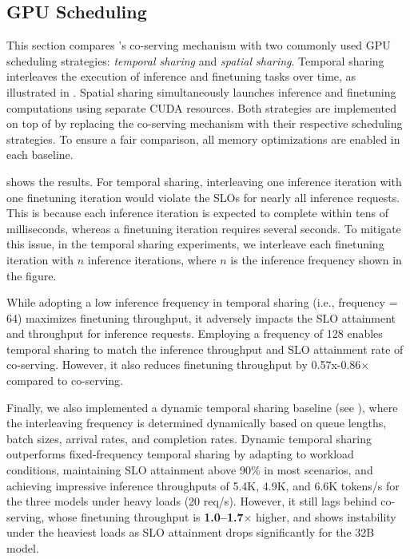 \subsection{GPU Scheduling}

This section compares \sys's co-serving mechanism with two commonly used GPU scheduling strategies: {\em temporal sharing} and {\em spatial sharing}. 
Temporal sharing interleaves the execution of inference and finetuning tasks over time, as illustrated in . Spatial sharing simultaneously launches inference and finetuning computations using separate CUDA resources. Both strategies are implemented on top of \sys by replacing the co-serving mechanism with their respective scheduling strategies. To ensure a fair comparison, all memory optimizations are enabled in each baseline. 

 shows the results. For temporal sharing, interleaving one inference iteration with one finetuning iteration would violate the SLOs for nearly all inference requests.
This is because each inference iteration is expected to complete within tens of milliseconds, whereas a finetuning iteration requires several seconds. To mitigate this issue, in the temporal sharing experiments, we interleave each finetuning iteration with $n$ inference iterations, where $n$ is the inference frequency shown in the figure.

While adopting a low inference frequency in temporal sharing (i.e., frequency = 64) maximizes finetuning throughput, it adversely impacts the SLO attainment and throughput for inference requests.
Employing a frequency of 128 enables temporal sharing to match the inference throughput and SLO attainment rate of co-serving. However, it also reduces finetuning throughput by 0.57x-0.86$\times$ compared to co-serving.

Finally, we also implemented a dynamic temporal sharing baseline (see ), where the interleaving frequency is determined dynamically based on queue lengths, batch sizes, arrival rates, and completion rates.
Dynamic temporal sharing outperforms fixed-frequency temporal sharing by adapting to workload conditions, maintaining SLO attainment above 90\% in most scenarios, and achieving impressive inference throughputs of 5.4K, 4.9K, and 6.6K tokens/s for the three models under heavy loads (20 req/s). However, it still lags behind co-serving, whose finetuning throughput is \textbf{1.0–1.7$\times$} higher, and shows instability under the heaviest loads as SLO attainment drops significantly for the 32B model.

